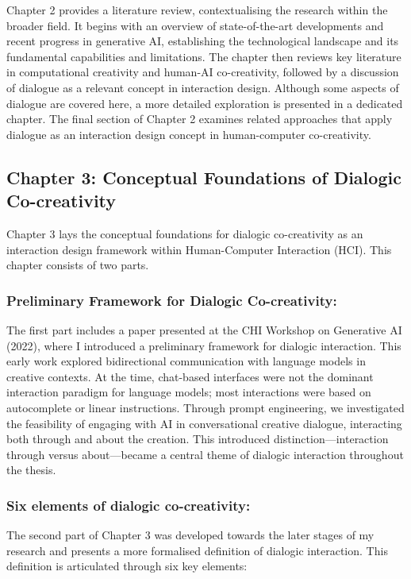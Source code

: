 Chapter 2 provides a literature review, contextualising the research within the broader field. It begins with an overview of state-of-the-art developments and recent progress in generative AI, establishing the technological landscape and its fundamental capabilities and limitations. The chapter then reviews key literature in computational creativity and human-AI co-creativity, followed by a discussion of dialogue as a relevant concept in interaction design. Although some aspects of dialogue are covered here, a more detailed exploration is presented in a dedicated chapter. The final section of Chapter 2 examines related approaches that apply dialogue as an interaction design concept in human-computer co-creativity.

\subsection{Chapter 3: Conceptual Foundations of Dialogic Co-creativity}

Chapter 3 lays the conceptual foundations for dialogic co-creativity as an interaction design framework within Human-Computer Interaction (HCI). This chapter consists of two parts. 

\subsubsection{Preliminary Framework for Dialogic Co-creativity: } The first part includes a paper presented at the CHI Workshop on Generative AI (2022), where I introduced a preliminary framework for dialogic interaction. This early work explored bidirectional communication with language models in creative contexts. At the time, chat-based interfaces were not the dominant interaction paradigm for language models; most interactions were based on autocomplete or linear instructions. Through prompt engineering, we investigated the feasibility of engaging with AI in conversational creative dialogue, interacting both through and about the creation. This introduced distinction—interaction through versus about—became a central theme of dialogic interaction throughout the thesis.

\subsubsection{Six elements of dialogic co-creativity:} The second part of Chapter 3 was developed towards the later stages of my research and presents a more formalised definition of dialogic interaction. This definition is articulated through six key elements:

